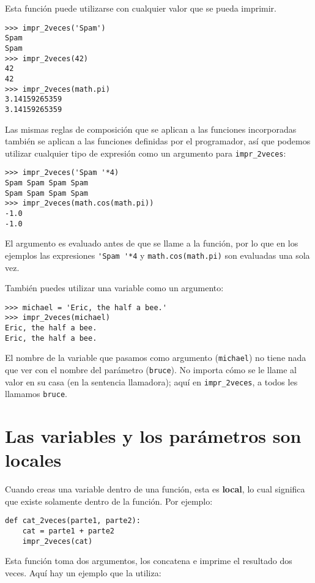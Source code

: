 \documentclass[10pt]{book}
\begin{document}
Esta función puede utilizarse con cualquier valor que se pueda imprimir.

\begin{verbatim}
>>> impr_2veces('Spam')
Spam
Spam
>>> impr_2veces(42)
42
42
>>> impr_2veces(math.pi)
3.14159265359
3.14159265359
\end{verbatim}
%
Las mismas reglas de composición que se aplican a las funciones incorporadas también
se aplican a las funciones definidas por el programador, así que podemos utilizar cualquier tipo de expresión
como un argumento para \verb"impr_2veces":

\begin{verbatim}
>>> impr_2veces('Spam '*4)
Spam Spam Spam Spam
Spam Spam Spam Spam
>>> impr_2veces(math.cos(math.pi))
-1.0
-1.0
\end{verbatim}
%
El argumento es evaluado antes de que se llame a la función, por lo que
en los ejemplos las expresiones \verb"'Spam '*4" y
{\tt math.cos(math.pi)} son evaluadas una sola vez.

También puedes utilizar una variable como un argumento:

\begin{verbatim}
>>> michael = 'Eric, the half a bee.'
>>> impr_2veces(michael)
Eric, the half a bee.
Eric, the half a bee.
\end{verbatim}
%
El nombre de la variable que pasamos como argumento ({\tt michael}) no tiene
nada que ver con el nombre del parámetro ({\tt bruce}).  No
importa cómo se le llame al valor en su casa (en la sentencia llamadora);
aquí en \verb"impr_2veces", a todos les llamamos {\tt bruce}.


\section{Las variables y los parámetros son locales}

Cuando creas una variable dentro de una función, esta es {\bf local},
lo cual significa que existe
solamente dentro de la función.  Por ejemplo:

\begin{verbatim}
def cat_2veces(parte1, parte2):
    cat = parte1 + parte2
    impr_2veces(cat)
\end{verbatim}
%
Esta función toma dos argumentos, los concatena e imprime
el resultado dos veces.  Aquí hay un ejemplo que la utiliza:
\end{document}
